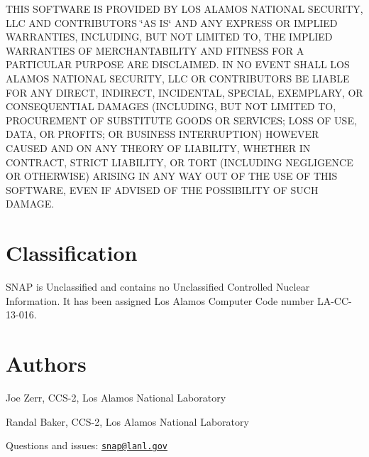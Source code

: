 T\-H\-I\-S S\-O\-F\-T\-W\-A\-R\-E I\-S P\-R\-O\-V\-I\-D\-E\-D B\-Y L\-O\-S A\-L\-A\-M\-O\-S N\-A\-T\-I\-O\-N\-A\-L S\-E\-C\-U\-R\-I\-T\-Y, L\-L\-C A\-N\-D C\-O\-N\-T\-R\-I\-B\-U\-T\-O\-R\-S \char`\"{}\-A\-S I\-S\char`\"{} A\-N\-D A\-N\-Y E\-X\-P\-R\-E\-S\-S O\-R I\-M\-P\-L\-I\-E\-D W\-A\-R\-R\-A\-N\-T\-I\-E\-S, I\-N\-C\-L\-U\-D\-I\-N\-G, B\-U\-T N\-O\-T L\-I\-M\-I\-T\-E\-D T\-O, T\-H\-E I\-M\-P\-L\-I\-E\-D W\-A\-R\-R\-A\-N\-T\-I\-E\-S O\-F M\-E\-R\-C\-H\-A\-N\-T\-A\-B\-I\-L\-I\-T\-Y A\-N\-D F\-I\-T\-N\-E\-S\-S F\-O\-R A P\-A\-R\-T\-I\-C\-U\-L\-A\-R P\-U\-R\-P\-O\-S\-E A\-R\-E D\-I\-S\-C\-L\-A\-I\-M\-E\-D. I\-N N\-O E\-V\-E\-N\-T S\-H\-A\-L\-L L\-O\-S A\-L\-A\-M\-O\-S N\-A\-T\-I\-O\-N\-A\-L S\-E\-C\-U\-R\-I\-T\-Y, L\-L\-C O\-R C\-O\-N\-T\-R\-I\-B\-U\-T\-O\-R\-S B\-E L\-I\-A\-B\-L\-E F\-O\-R A\-N\-Y D\-I\-R\-E\-C\-T, I\-N\-D\-I\-R\-E\-C\-T, I\-N\-C\-I\-D\-E\-N\-T\-A\-L, S\-P\-E\-C\-I\-A\-L, E\-X\-E\-M\-P\-L\-A\-R\-Y, O\-R C\-O\-N\-S\-E\-Q\-U\-E\-N\-T\-I\-A\-L D\-A\-M\-A\-G\-E\-S (I\-N\-C\-L\-U\-D\-I\-N\-G, B\-U\-T N\-O\-T L\-I\-M\-I\-T\-E\-D T\-O, P\-R\-O\-C\-U\-R\-E\-M\-E\-N\-T O\-F S\-U\-B\-S\-T\-I\-T\-U\-T\-E G\-O\-O\-D\-S O\-R S\-E\-R\-V\-I\-C\-E\-S; L\-O\-S\-S O\-F U\-S\-E, D\-A\-T\-A, O\-R P\-R\-O\-F\-I\-T\-S; O\-R B\-U\-S\-I\-N\-E\-S\-S I\-N\-T\-E\-R\-R\-U\-P\-T\-I\-O\-N) H\-O\-W\-E\-V\-E\-R C\-A\-U\-S\-E\-D A\-N\-D O\-N A\-N\-Y T\-H\-E\-O\-R\-Y O\-F L\-I\-A\-B\-I\-L\-I\-T\-Y, W\-H\-E\-T\-H\-E\-R I\-N C\-O\-N\-T\-R\-A\-C\-T, S\-T\-R\-I\-C\-T L\-I\-A\-B\-I\-L\-I\-T\-Y, O\-R T\-O\-R\-T (I\-N\-C\-L\-U\-D\-I\-N\-G N\-E\-G\-L\-I\-G\-E\-N\-C\-E O\-R O\-T\-H\-E\-R\-W\-I\-S\-E) A\-R\-I\-S\-I\-N\-G I\-N A\-N\-Y W\-A\-Y O\-U\-T O\-F T\-H\-E U\-S\-E O\-F T\-H\-I\-S S\-O\-F\-T\-W\-A\-R\-E, E\-V\-E\-N I\-F A\-D\-V\-I\-S\-E\-D O\-F T\-H\-E P\-O\-S\-S\-I\-B\-I\-L\-I\-T\-Y O\-F S\-U\-C\-H D\-A\-M\-A\-G\-E.

\section*{Classification}

S\-N\-A\-P is Unclassified and contains no Unclassified Controlled Nuclear Information. It has been assigned Los Alamos Computer Code number L\-A-\/\-C\-C-\/13-\/016.

\section*{Authors}


\begin{DoxyItemize}
\item Joe Zerr, C\-C\-S-\/2, Los Alamos National Laboratory
\item Randal Baker, C\-C\-S-\/2, Los Alamos National Laboratory
\end{DoxyItemize}

Questions and issues\-: \href{mailto:snap@lanl.gov}{\tt snap@lanl.\-gov} 